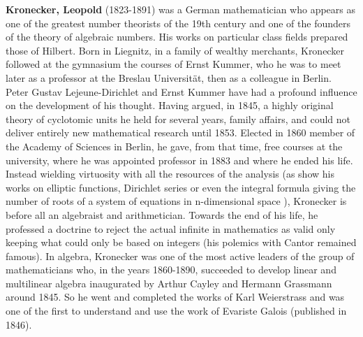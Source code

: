 \textbf{Kronecker, Leopold} (1823-1891) was a German mathematician who appears as one of the greatest number theorists of the 19th century and one of the founders of the theory of algebraic numbers. His works on particular class fields prepared those of Hilbert. Born in Liegnitz, in a family of wealthy merchants, Kronecker followed at the gymnasium the courses of Ernst Kummer, who he was to meet later as a professor at the Breslau Universität, then as a colleague in Berlin. Peter Gustav Lejeune-Dirichlet and Ernst Kummer have had a profound influence on the development of his thought. Having argued, in 1845, a highly original theory of cyclotomic units he held for several years, family affairs, and could not deliver entirely new mathematical research until 1853. Elected in 1860 member of the Academy of Sciences in Berlin, he gave, from that time, free courses at the university, where he was appointed professor in 1883 and where he ended his life. Instead wielding virtuosity with all the resources of the analysis (as show his works on elliptic functions, Dirichlet series or even the integral formula giving the number of roots of a system of equations in n-dimensional space ), Kronecker is before all an algebraist and arithmetician. Towards the end of his life, he professed a doctrine to reject the actual infinite in mathematics as valid only keeping what could only be based on integers (his polemics with Cantor remained famous). In algebra, Kronecker was one of the most active leaders of the group of mathematicians who, in the years 1860-1890, succeeded to develop linear and multilinear algebra inaugurated by Arthur Cayley and Hermann Grassmann around 1845. So he went and completed the works of Karl Weierstrass and was one of the first to understand and use the work of Evariste Galois (published in 1846).

{}

